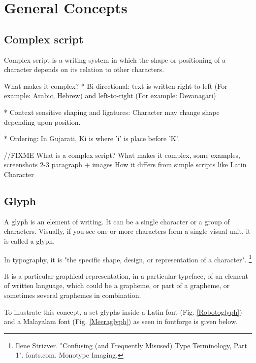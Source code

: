 \chapter{General Concepts}

\section{Complex script }

Complex script is a writing system in which the shape or positioning of a character
depends on its relation to other characters.

What makes it complex?
* Bi-directional: text is written right-to-left (For example: Arabic, Hebrew)
and left-to-right (For example: Devanagari)

* Context sensitive shaping and ligatures: Character may change shape depending
upon position.

* Ordering:
In Gujarati, Ki is where 'i' is place before 'K'.

//FIXME
What is a complex script? What makes it complex, some examples, screenshots
2-3 paragraph + images
How it differs from simple scripts like Latin Character

\section{Glyph }

A glyph is an element of writing. It can be a single character or a group of characters. 
Visually, if you see one or more characters form a single visual unit, it is called a glyph.

In typography, it is "the specific shape, design, or representation of a character".
\footnote{Ilene Strizver. "Confusing (and Frequently Misused) Type Terminology, Part 1". fonts.com. Monotype Imaging.}

It is a particular graphical representation, in a particular typeface, of an element of written language, which could be a grapheme, or part of a grapheme, or sometimes several graphemes in combination. 
 
To illustrate this concept, a set glyphs inside a Latin font (Fig. \ref{Robotoglyph}) and a Malayalam font  (Fig. \ref{Meeraglyph}) as seen in fontforge is given below.

